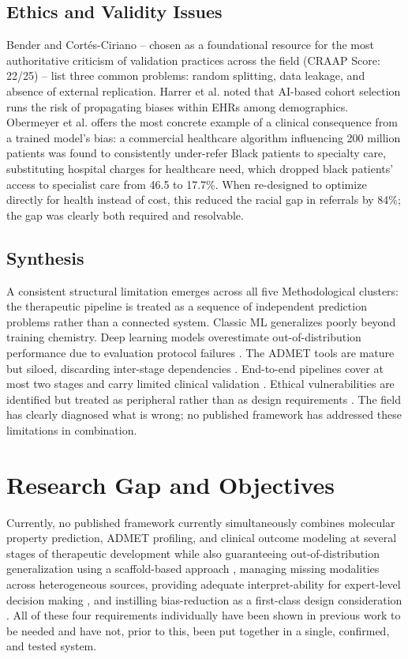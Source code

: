 \documentclass[conference]{IEEEtran}
\begin{document}
\subsection{Ethics and Validity Issues }
Bender and Cort\'{e}s-Ciriano \cite{b4} -- chosen as a foundational resource for the most authoritative criticism of validation practices across the field (CRAAP Score: 22/25) -- list three common problems: random splitting, data leakage, and absence of external replication. Harrer et al. \cite{b1} noted that AI-based cohort selection runs the risk of propagating biases within EHRs among demographics. Obermeyer et al. \cite{b10} offers the most concrete example of a clinical consequence from a trained model's bias: a commercial healthcare algorithm influencing 200 million patients was found to consistently under-refer Black patients to specialty care, substituting hospital charges for healthcare need, which dropped black patients' access to specialist care from 46.5 to 17.7\%. When re-designed to optimize directly for health instead of cost, this reduced the racial gap in referrals by 84\%; the gap was clearly both required and resolvable.

\subsection{Synthesis}
A consistent structural limitation emerges across all five Methodological clusters: the therapeutic pipeline is treated as a sequence of independent prediction problems rather than a connected system. Classic ML generalizes poorly beyond training chemistry. Deep learning models overestimate out-of-distribution performance due to evaluation protocol failures \cite{b4, b5}. The ADMET tools are mature but siloed, discarding inter-stage dependencies \cite{b7, b8}. End-to-end pipelines cover at most two stages and carry limited clinical validation \cite{b3, b2}. Ethical vulnerabilities are identified but treated as peripheral rather than as design requirements \cite{b10, b9}. The field has clearly diagnosed what is wrong; no published framework has addressed these limitations in combination.

 
\section{Research Gap and Objectives}
Currently, no published framework currently simultaneously combines molecular property prediction, ADMET profiling, and clinical outcome modeling at several stages of therapeutic development while also guaranteeing out-of-distribution generalization using a scaffold-based approach \cite{b5}, managing missing modalities across heterogeneous sources, providing adequate interpret-ability for expert-level decision making \cite{b7}, and instilling bias-reduction as a first-class design consideration \cite{b10}. All of these four requirements individually have been shown in previous work to be needed and have not, prior to this, been put together in a single, confirmed, and tested system.
\end{document}
